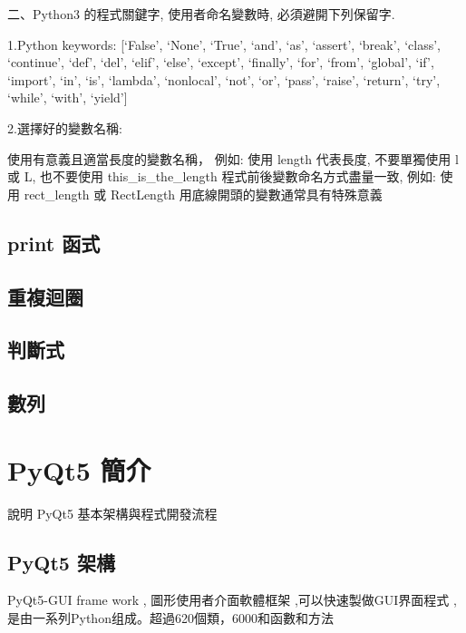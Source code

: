 \documentclass[12pt,,]{report}
\begin{document}
二、Python3 的程式關鍵字, 使用者命名變數時, 必須避開下列保留字.

1.Python keywords: {[}`False', `None', `True', `and', `as', `assert',
`break', `class', `continue', `def', `del', `elif', `else', `except',
`finally', `for', `from', `global', `if', `import', `in', `is',
`lambda', `nonlocal', `not', `or', `pass', `raise', `return', `try',
`while', `with', `yield'{]}

2.選擇好的變數名稱:

使用有意義且適當長度的變數名稱， 例如: 使用 length 代表長度,
不要單獨使用 l 或 L, 也不要使用 this\_is\_the\_length
程式前後變數命名方式盡量一致, 例如: 使用 rect\_length 或 RectLength
用底線開頭的變數通常具有特殊意義

\hypertarget{print-ux51fdux5f0f}{%
\section{print 函式}\label{print-ux51fdux5f0f}}

\hypertarget{ux91cdux8907ux8ff4ux5708}{%
\section{重複迴圈}\label{ux91cdux8907ux8ff4ux5708}}

\hypertarget{ux5224ux65b7ux5f0f}{%
\section{判斷式}\label{ux5224ux65b7ux5f0f}}

\hypertarget{ux6578ux5217}{%
\section{數列}\label{ux6578ux5217}}

\hypertarget{pyqt5-ux7c21ux4ecb}{%
\chapter{PyQt5 簡介}\label{pyqt5-ux7c21ux4ecb}}

說明 PyQt5 基本架構與程式開發流程

\hypertarget{pyqt5-ux67b6ux69cb}{%
\section{PyQt5 架構}\label{pyqt5-ux67b6ux69cb}}

PyQt5-GUI frame work , 圖形使用者介面軟體框架 ,可以快速製做GUI界面程式 ,
是由一系列Python组成。超過620個類，6000和函數和方法
\end{document}
